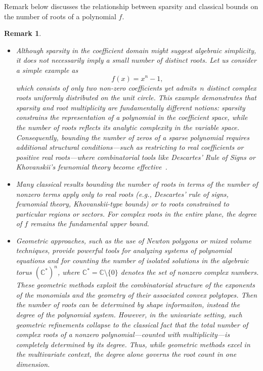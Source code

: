\documentclass[11pt]{article}
\newtheorem{remark}{Remark}
\begin{document}
Remark below discusses the relationship between sparsity and classical bounds on the number of roots of a polynomial \(f\).

\begin{remark}

\begin{itemize}
  \item Although sparsity in the coefficient domain might suggest algebraic simplicity, it does not necessarily imply a small number of distinct roots. Let us consider a simple example as 
\[
f(x) = x^n - 1,
\]
which consists of only two non-zero coefficients yet admits~$n$ distinct complex roots uniformly distributed on the unit circle. This example demonstrates that \emph{sparsity and root multiplicity are fundamentally different notions}: sparsity constrains the representation of a polynomial in the coefficient space, while the number of roots reflects its analytic complexity in the variable space. Consequently, bounding the number of zeros of a sparse polynomial requires additional structural conditions---such as restricting to real coefficients or positive real roots---where combinatorial tools like \emph{Descartes’ Rule of Signs} or \emph{Khovanskii’s fewnomial theory} become effective~\cite{khovanskiui1991fewnomials}.

  
  \item Many classical results bounding the number of roots in terms of the number of nonzero terms apply only to \emph{real} roots (e.g., Descartes’ rule of signs, fewnomial theory, Khovanskii-type bounds) or to roots constrained to particular regions or sectors.   For complex roots in the entire plane, the degree of \(f\) remains the fundamental upper bound.
  
  \item Geometric approaches, such as the use of \emph{Newton polygons} or \emph{mixed volume} techniques, provide powerful tools for analyzing systems of polynomial equations and for counting the number of isolated solutions in the algebraic torus \((\mathbb{C}^\ast)^n\), where \(\mathbb{C}^\ast = \mathbb{C} \setminus \{0\}\) denotes the set of nonzero complex numbers. These geometric methods exploit the combinatorial structure of the exponents of the monomials and the geometry of their associated convex polytopes. Then the number of roots can be determined by shape informaiton, instead the degree of the polynomial system. However, in the univariate setting, such geometric refinements collapse to the classical fact that the total number of complex roots of a nonzero polynomial—counted with multiplicity—is completely determined by its degree. Thus, while geometric methods excel in the multivariate context, the degree alone governs the root count in one dimension.

\end{itemize}
\end{remark}
\end{document}
